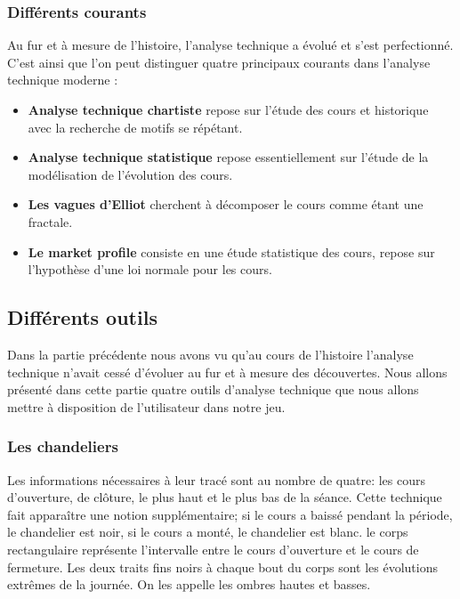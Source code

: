 \subsubsection{Différents courants}

Au fur et à mesure de l'histoire, l'analyse technique a évolué et s'est perfectionné. C'est ainsi que l'on peut distinguer quatre principaux courants dans l'analyse technique moderne :
\begin{itemize}
\item \textbf{Analyse technique chartiste} repose sur l'étude des cours et historique avec la recherche de motifs se répétant.  
\item \textbf{Analyse technique statistique} repose essentiellement sur l'étude de la modélisation de l'évolution des cours.
\item \textbf{Les vagues d'Elliot} cherchent à décomposer le cours comme étant une fractale.
\item \textbf{Le market profile} consiste en une étude statistique des cours, repose sur l'hypothèse d'une loi normale pour les cours. 
\end{itemize}

\subsection{Différents outils}
Dans la partie précédente nous avons vu qu'au cours de l'histoire l'analyse technique n'avait cessé d'évoluer au fur et à mesure des découvertes. Nous allons présenté dans cette partie quatre outils d'analyse technique que nous allons mettre à disposition de l'utilisateur dans notre jeu. \\

\subsubsection{Les chandeliers}
Les informations nécessaires à leur tracé sont au nombre de quatre: les cours d'ouverture, de clôture, le plus haut et le plus bas de la séance. Cette technique fait apparaître une notion supplémentaire; si le cours a baissé pendant la période, le chandelier est noir, si le cours a monté, le chandelier est blanc. le corps rectangulaire représente l'intervalle entre le cours d'ouverture et le cours de fermeture. Les deux traits fins noirs à chaque bout du corps sont les évolutions extrêmes de la journée. On les appelle les ombres hautes et basses.

